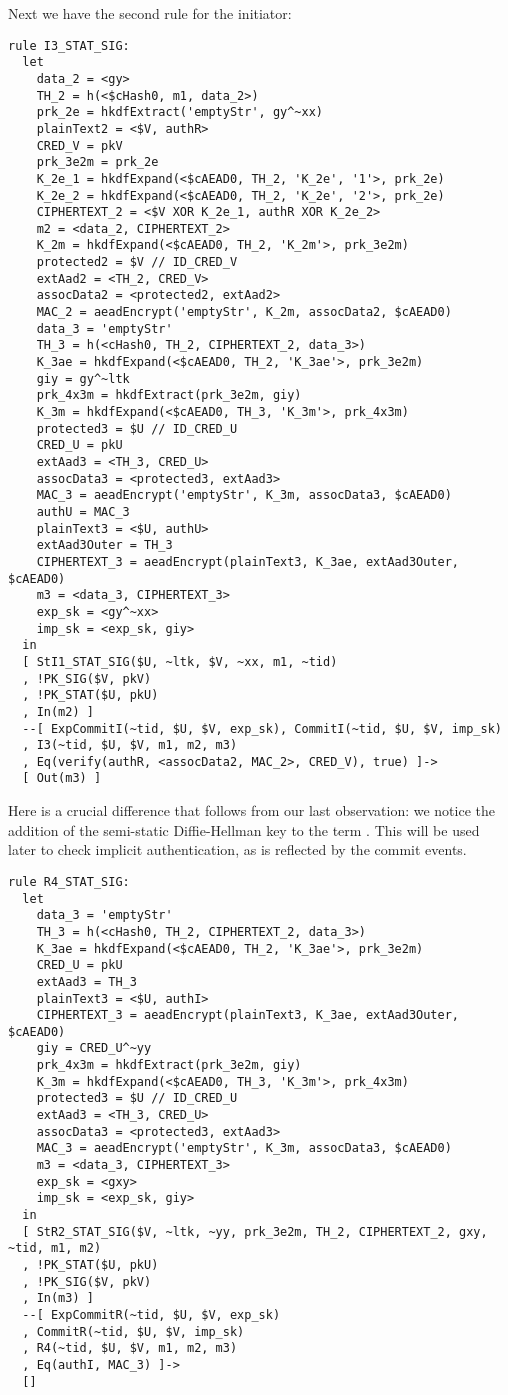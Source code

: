 Next we have the second rule for the initiator:
\begin{lstlisting}
rule I3_STAT_SIG:
  let
    data_2 = <gy> 
    TH_2 = h(<$cHash0, m1, data_2>)
    prk_2e = hkdfExtract('emptyStr', gy^~xx)
    plainText2 = <$V, authR> 
    CRED_V = pkV
    prk_3e2m = prk_2e
    K_2e_1 = hkdfExpand(<$cAEAD0, TH_2, 'K_2e', '1'>, prk_2e)
    K_2e_2 = hkdfExpand(<$cAEAD0, TH_2, 'K_2e', '2'>, prk_2e)
    CIPHERTEXT_2 = <$V XOR K_2e_1, authR XOR K_2e_2> 
    m2 = <data_2, CIPHERTEXT_2>
    K_2m = hkdfExpand(<$cAEAD0, TH_2, 'K_2m'>, prk_3e2m)
    protected2 = $V // ID_CRED_V
    extAad2 = <TH_2, CRED_V> 
    assocData2 = <protected2, extAad2>
    MAC_2 = aeadEncrypt('emptyStr', K_2m, assocData2, $cAEAD0)
    data_3 = 'emptyStr' 
    TH_3 = h(<cHash0, TH_2, CIPHERTEXT_2, data_3>)
    K_3ae = hkdfExpand(<$cAEAD0, TH_2, 'K_3ae'>, prk_3e2m)
    giy = gy^~ltk
    prk_4x3m = hkdfExtract(prk_3e2m, giy)
    K_3m = hkdfExpand(<$cAEAD0, TH_3, 'K_3m'>, prk_4x3m)
    protected3 = $U // ID_CRED_U
    CRED_U = pkU
    extAad3 = <TH_3, CRED_U>
    assocData3 = <protected3, extAad3>
    MAC_3 = aeadEncrypt('emptyStr', K_3m, assocData3, $cAEAD0)
    authU = MAC_3
    plainText3 = <$U, authU>
    extAad3Outer = TH_3
    CIPHERTEXT_3 = aeadEncrypt(plainText3, K_3ae, extAad3Outer, $cAEAD0)
    m3 = <data_3, CIPHERTEXT_3>
    exp_sk = <gy^~xx>
    imp_sk = <exp_sk, giy>
  in
  [ StI1_STAT_SIG($U, ~ltk, $V, ~xx, m1, ~tid) 
  , !PK_SIG($V, pkV)
  , !PK_STAT($U, pkU)
  , In(m2) ]
  --[ ExpCommitI(~tid, $U, $V, exp_sk), CommitI(~tid, $U, $V, imp_sk)
  , I3(~tid, $U, $V, m1, m2, m3)
  , Eq(verify(authR, <assocData2, MAC_2>, CRED_V), true) ]->
  [ Out(m3) ]
\end{lstlisting}
Here is a crucial difference that follows from our last observation: we notice
the addition of the semi-static Diffie-Hellman key to the term .
This will be used later to check implicit authentication, as is reflected by the
commit events.

\begin{lstlisting}
rule R4_STAT_SIG:
  let
    data_3 = 'emptyStr'
    TH_3 = h(<cHash0, TH_2, CIPHERTEXT_2, data_3>)
    K_3ae = hkdfExpand(<$cAEAD0, TH_2, 'K_3ae'>, prk_3e2m)
    CRED_U = pkU
    extAad3 = TH_3
    plainText3 = <$U, authI>
    CIPHERTEXT_3 = aeadEncrypt(plainText3, K_3ae, extAad3Outer, $cAEAD0)
    giy = CRED_U^~yy
    prk_4x3m = hkdfExtract(prk_3e2m, giy)
    K_3m = hkdfExpand(<$cAEAD0, TH_3, 'K_3m'>, prk_4x3m)
    protected3 = $U // ID_CRED_U
    extAad3 = <TH_3, CRED_U>
    assocData3 = <protected3, extAad3>
    MAC_3 = aeadEncrypt('emptyStr', K_3m, assocData3, $cAEAD0)
    m3 = <data_3, CIPHERTEXT_3>
    exp_sk = <gxy>
    imp_sk = <exp_sk, giy>
  in
  [ StR2_STAT_SIG($V, ~ltk, ~yy, prk_3e2m, TH_2, CIPHERTEXT_2, gxy, ~tid, m1, m2) 
  , !PK_STAT($U, pkU)
  , !PK_SIG($V, pkV)
  , In(m3) ]
  --[ ExpCommitR(~tid, $U, $V, exp_sk)
  , CommitR(~tid, $U, $V, imp_sk)
  , R4(~tid, $U, $V, m1, m2, m3)
  , Eq(authI, MAC_3) ]->
  []
\end{lstlisting}


